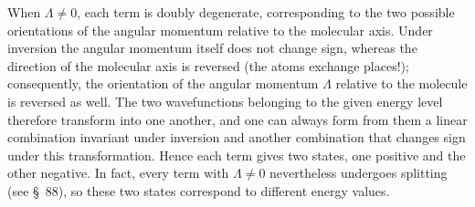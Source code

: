 When $\Lambda\ne0$, each term is doubly degenerate, corresponding to the two possible orientations of the angular momentum relative to the molecular axis. Under inversion the angular momentum itself does not change sign, whereas the direction of the molecular axis is reversed (the atoms exchange places!); consequently, the orientation of the angular momentum $\Lambda$ relative to the molecule is reversed as well. The two wavefunctions belonging to the given energy level therefore transform into one another, and one can always form from them a linear combination invariant under inversion and another combination that changes sign under this transformation. Hence each term gives two states, one positive and the other negative. In fact, every term with $\Lambda\ne0$ nevertheless undergoes splitting (see \S~88), so these two states correspond to different energy values.
